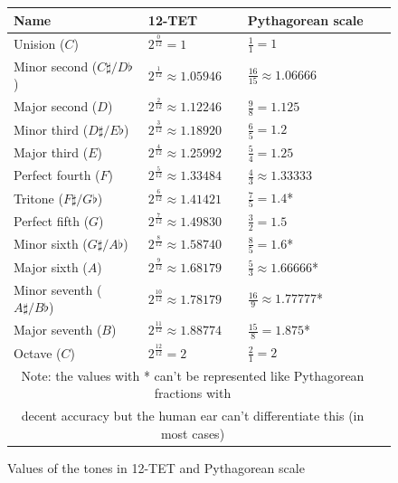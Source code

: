 \documentclass[]{article}
\begin{document}
                \begin{figure}[h]
                    \begin{center}
                        \begin{tabular}{| l | l | l | l |}
                            \hline
                            \textbf{Name} & \textbf{12-TET} & \textbf{Pythagorean scale}\\\hline
                            Unision ($C$) & $2^\frac{0}{12} = 1$ & $\frac{1}{1} = 1$ \\ \hline
                            Minor second ($C\sharp/D\flat$) & $2^\frac{1}{12} \approx 1.05946$ & $\frac{16}{15} \approx 1.06666$\\ \hline
                            Major second ($D$) & $2^\frac{2}{12} \approx 1.12246$ & $\frac{9}{8} = 1.125$ \\ \hline
                            Minor third ($D\sharp/E\flat$) & $2^\frac{3}{12} \approx 1.18920$ & $\frac{6}{5} = 1.2$ \\ \hline
                            Major third ($E$) & $2^\frac{4}{12} \approx 1.25992$ & $\frac{5}{4} = 1.25$ \\ \hline
                            Perfect fourth ($F$) & $2^\frac{5}{12} \approx 1.33484$ & $\frac{4}{3} \approx 1.33333$ \\ \hline
                            Tritone ($F\sharp/G\flat$) & $2^\frac{6}{12} \approx 1.41421$ & $\frac{7}{5} = 1.4$* \\ \hline
                            Perfect fifth ($G$) & $2^\frac{7}{12} \approx 1.49830$ & $\frac{3}{2} = 1.5$ \\ \hline
                            Minor sixth ($G\sharp/A\flat$) & $2^\frac{8}{12} \approx 1.58740$ & $\frac{8}{5} = 1.6$* \\ \hline
                            Major sixth ($A$) & $2^\frac{9}{12} \approx 1.68179$ & $\frac{5}{3} \approx 1.66666$* \\ \hline
                            Minor seventh ($A\sharp/B\flat$) & $2^\frac{10}{12} \approx 1.78179$ & $\frac{16}{9} \approx 1.77777$* \\ \hline
                            Major seventh ($B$) & $2^\frac{11}{12} \approx 1.88774$ & $\frac{15}{8} = 1.875$* \\ \hline
                            Octave ($C$) & $2^\frac{12}{12} = 2$ & $\frac{2}{1} = 2$ \\ \hline
                            \multicolumn{3}{c}{Note: the values with * can't be represented like Pythagorean fractions with}\\
                            \multicolumn{3}{c}{decent accuracy but the human ear can't differentiate this (in most cases)}\\
                        \end{tabular}
                        \caption{Values of the tones in 12-TET and Pythagorean scale}
                    \end{center}
                \end{figure}
\end{document}
